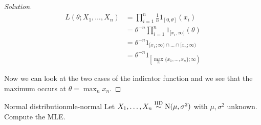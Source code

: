 \documentclass[12pt]{extarticle}
\newcommand{\Normal}{{\operatorfont N}}
\begin{document}
\begin{proof}[Solution]
	\begin{align}
		L(\theta; X_1, \dots, X_n) & = \prod_{i = 1}^n \frac{1}{n} 1_{[0, \theta]}(x_i)                \\
		                           & =\theta^{-n} \prod_{i = 1}^n 1_{[x_i, \infty)} (\theta)           \\ %
		                           & = \theta^{-n} 1_{[x_1; \infty) \cap \dots \cap [x_n; \infty)}     \\
		                           & = \theta^{-n} 1_{\left[\max_n \{x_1, \dots, x_n\}; \infty\right)}
	\end{align}

	Now we can look at the two cases of the indicator function and we see that the maximum occurs at $\hat \theta = \max_n x_n$.
\end{proof}

\begin{example}{Normal distribution}{mle-normal}
	Let $X_1, \dots, X_n \stackrel{\text{IID}}{\sim} \Normal(\mu,\sigma^2)$ with $\mu,\sigma^2$ unknown.
	Compute the MLE.
\end{example}
\end{document}
